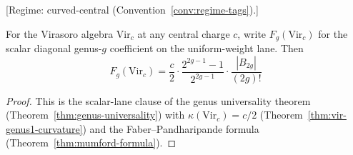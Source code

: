 \begin{theorem}\label{thm:vir-all-genera}

\textup{[Regime: curved-central
\textup{(}Convention~\textup{\ref{conv:regime-tags})}.]}

For the Virasoro algebra $\mathrm{Vir}_c$ at any central charge $c$,
write $F_g(\mathrm{Vir}_c)$ for the scalar diagonal genus-$g$
coefficient on the uniform-weight lane. Then
\begin{equation}\label{eq:vir-Fg}
F_g(\mathrm{Vir}_c) = \frac{c}{2} \cdot \frac{2^{2g-1}-1}{2^{2g-1}} \cdot \frac{|B_{2g}|}{(2g)!}
\end{equation}
\end{theorem}

\begin{proof}
This is the scalar-lane clause of the genus universality theorem
(Theorem~\ref{thm:genus-universality}) with
$\kappa(\mathrm{Vir}_c) = c/2$
(Theorem~\ref{thm:vir-genus1-curvature}) and the
Faber--Pandharipande formula (Theorem~\ref{thm:mumford-formula}).
\end{proof}

